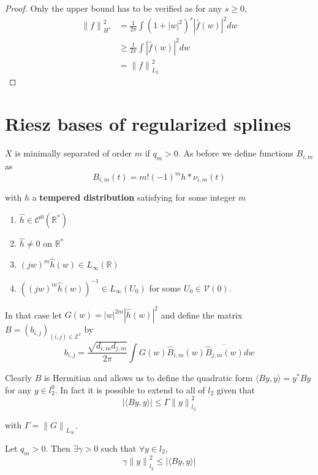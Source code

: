 \documentclass[a4paper, 11pt]{article}
\begin{document}
\begin{proof}
  Only the upper bound has to be verified as for any $s \geq 0$,
  \begin{align*}
    {\|f\|}_{H^s}^2 &= \frac{1}{2\pi} \int {(1+|w|^2)}^s |\hat{f}(w)|^2 dw \\
    &\geq \frac{1}{2\pi} \int |\hat{f}(w)|^2 dw \\
    & = {\|f\|}_{L_2}^2
  \end{align*}
\end{proof}

\section{Riesz bases of regularized splines}

$X$ is minimally separated of order $m$ if $q_m > 0$. As before we define functions $B_{i,m}$ as
\begin{equation*}
  B_{i,m}(t) = m! {(-1)}^m h*\nu_{i,m}(t)
\end{equation*}

with $h$ a \textbf{tempered distribution} satisfying for some integer $m$
\begin{enumerate}
  \item $\hat{h} \in \mathcal{C}^0(\mathbb{R}^*)$
  \item $\hat{h} \neq 0$ on $\mathbb{R}^*$
  \item ${(jw)}^m\hat{h}(w) \in L_{\infty}(\mathbb{R})$
  \item ${\left({(jw)}^m\hat{h}(w)\right)}^{-1} \in L_{\infty}(U_0)$ for some $U_0 \in \mathcal{V}(0)$.
\end{enumerate}

In that case let $G(w) = |w|^{2m} |\hat{h}(w)|^2$ and define the matrix $B = {(b_{i,j})}_{(i,j) \in \mathbb{Z}^2}$ by
\begin{equation}
  b_{i,j} = \frac{\sqrt{d_{i,m}d_{j,m}}}{2\pi} \int G(w) \hat{B}_{i,m}(w) \overline{\hat{B}_{j,m}(w)} dw
\end{equation}

Clearly $B$ is Hermitian and allows us to define the quadratic form $\langle By, y \rangle = y^* By$ for any $y \in 
l_2^0$. In fact it is possible to extend to all of $l_2$ given that
\begin{equation*}
  |\langle By, y\rangle| \leq \Gamma {\|y\|}_{l_2}^2
\end{equation*}

with $\Gamma = {\|G\|}_{L_{\infty}}$.

\begin{thm}{2}
  Let $q_m > 0$. Then $\exists \gamma > 0$ such that $\forall y \in l_2$, 
  \begin{equation}
    \gamma {\|y\|}_{l_2}^2 \leq |\langle By, y \rangle|
  \end{equation}
\end{thm}
\end{document}
